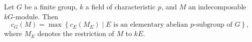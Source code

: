 \begin{theorem}
\label{thm:alperin-evens-carlson}
Let $G$ be a finite group, $k$ a field of characteristic $p$, and $M$ an indecomposable $kG$-module. Then
$$
c_G(M) = \max\left\{ c_E(M_E) \mid E \text{ is an elementary abelian $p$-subgroup of } G \right\},
$$
where $M_E$ denotes the restriction of $M$ to $kE$.
\end{theorem}
